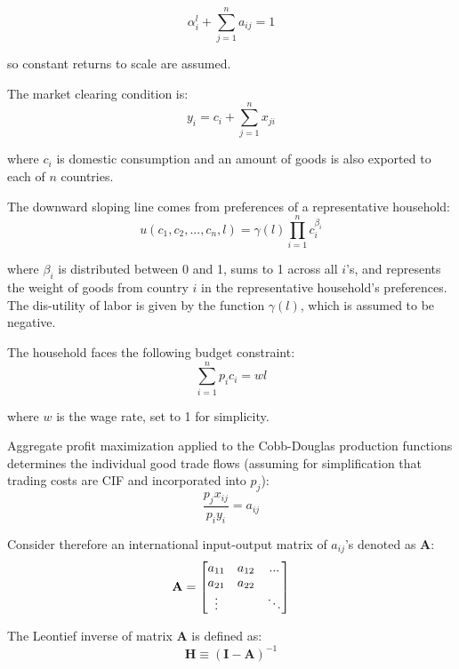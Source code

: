 \documentclass[10pt,letterpaper]{article}
\begin{document}
\begin{equation*}
 \alpha_i^l + \sum_{j=1}^{n} a_{ij} = 1
\end{equation*}

so constant returns to scale are assumed. 

The market clearing condition is:
\begin{equation*}
y_i = c_i + \sum_{j=1}^{n} x_{ji}
\end{equation*}

where $c_i$ is domestic consumption and an amount of goods is also exported to each of $n$ countries.

The downward sloping line comes from preferences of a representative household:
\begin{equation*}
u(c_1,c_2,...,c_n,l) = \gamma (l) \prod_{i=1}^{n} c_i^{\beta_i}
\end{equation*}

where $\beta_i$ is distributed between 0 and 1, sums to 1 across all $i$'s, and represents the weight of goods from country $i$ in the representative household's preferences. The dis-utility of labor is given by the function $\gamma (l)$, which is assumed to be negative.

The household faces the following budget constraint:
\begin{equation*}
 \sum_{i=1}^{n} p_ic_i = wl
\end{equation*}

where $w$ is the wage rate, set to 1 for simplicity.

Aggregate profit maximization applied to the Cobb-Douglas production functions determines the individual good trade flows (assuming for simplification that trading costs are CIF and incorporated into $p_j$):
$$ \frac{p_jx_{ij}}{p_iy_i} = a_{ij}$$

Consider therefore an international input-output matrix of $a_{ij}$'s denoted as \textbf{A}:
\begin{equation*}
\text{\textbf{A}} = \begin{bmatrix}
		a_{11} & a_{12} & ... \\
		a_{21} & a_{22} &  \\
		\vdots &  & \ddots 
		\end{bmatrix}
\end{equation*}		

The Leontief inverse of matrix \textbf{A} is defined as:
\begin{equation*}
 \mathbf{H} \equiv (\mathbf{I} - \mathbf{A})^{-1} 
\end{equation*}
\end{document}
